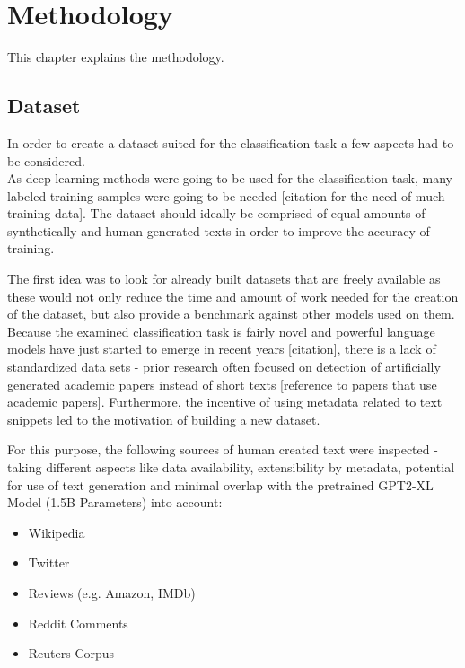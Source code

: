 \section{Methodology}
\label{ch:methodology}

This chapter explains the methodology.

\subsection{Dataset}
\label{sec:dataset}

In order to create a dataset suited for the classification task a few aspects had to be considered. \\
As deep learning methods were going to be used for the classification task, many labeled training samples 
were going to be needed [citation for the need of much training data]. The dataset should ideally be comprised 
of equal amounts of synthetically and human generated texts in order to improve the accuracy of training.

The first idea was to look for already built datasets that are freely available as these would not only reduce 
the time and amount of work needed for the creation of the dataset, but also provide a benchmark against other 
models used on them. Because the examined classification task is fairly novel and powerful language models have 
just started to emerge in recent years [citation], there is a lack of standardized data sets - prior research 
often focused on detection of artificially generated academic papers instead of short texts 
[reference to papers that use academic papers]. Furthermore, the incentive of using metadata related to text 
snippets led to the motivation of building a new dataset.

For this purpose, the following sources of human created text were inspected - taking different aspects like 
data availability, extensibility by metadata, potential for use of text generation and minimal overlap with the 
pretrained GPT2-XL Model (1.5B Parameters) into account:

\begin{itemize}
    \item Wikipedia
    \item Twitter
    \item Reviews (e.g. Amazon, IMDb)
    \item Reddit Comments
    \item Reuters Corpus
\end{itemize}


